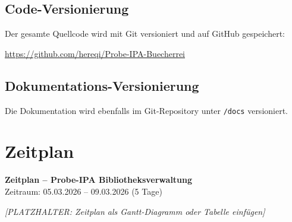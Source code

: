 \documentclass[a4paper,12pt,twoside]{report}
\begin{document}
\subsection{Code-Versionierung}
Der gesamte Quellcode wird mit Git versioniert und auf GitHub gespeichert:

\begin{center}
\url{https://github.com/hereqi/Probe-IPA-Buecherrei}
\end{center}

\subsection{Dokumentations-Versionierung}
Die Dokumentation wird ebenfalls im Git-Repository unter \texttt{/docs} versioniert.

\newpage

\section{Zeitplan}

\begin{landscape}
\thispagestyle{empty}

\vspace*{1cm}
{\Large\bfseries Zeitplan -- Probe-IPA Bibliotheksverwaltung}\\[0.5cm]
{\normalsize Zeitraum: 05.03.2026 -- 09.03.2026 (5 Tage)}\\[1cm]

\begin{center}
\textit{[PLATZHALTER: Zeitplan als Gantt-Diagramm oder Tabelle einfügen]}\\[2cm]

\end{center}

\end{landscape}

\newpage

\end{document}
